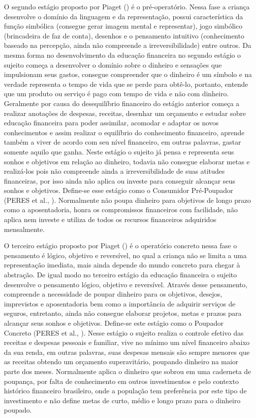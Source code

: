 O segundo estágio proposto por Piaget (\citeyear{piaget1971}) é o pré-operatório. Nessa fase a criança desenvolve o domínio da linguagem e da representação, possui característica da função simbólica (consegue gerar imagem mental e representar), jogo simbólico (brincadeira de faz de conta), desenhos e o pensamento intuitivo (conhecimento baseado na percepção, ainda não compreende a irreversibilidade) entre outros. Da mesma forma no desenvolvimento da educação financeira no segundo estágio o sujeito começa a desenvolver o domínio sobre o dinheiro e sensações que impulsionam seus gastos, consegue compreender que o dinheiro é um símbolo e na verdade representa o tempo de vida que se perde para obtê-lo, portanto, entende que um produto ou serviço é pago com tempo de vida e não com dinheiro. Geralmente por causa do desequilíbrio financeiro do estágio anterior começa a realizar anotações de despesas, receitas, desenhar um orçamento e estudar sobre educação financeira para poder assimilar, acomodar e adaptar os novos conhecimentos e assim realizar o equilíbrio do conhecimento financeiro, aprende também a viver de acordo com seu nível financeiro, em outras palavras, gastar somente aquilo que ganha. Neste estágio o sujeito já pensa e representa seus sonhos e objetivos em relação ao dinheiro, todavia não consegue elaborar metas e realizá-los pois não compreende ainda a irreversibilidade de suas atitudes financeiras, por isso ainda não aplica ou investe para conseguir alcançar seus sonhos e objetivos. Define-se esse estágio como o Consumidor Pré-Poupador (PERES et al., \citeyear{peres2019}). Normalmente não poupa dinheiro para objetivos de longo prazo como a aposentadoria, honra os compromissos financeiros com facilidade, não aplica nem investe e utiliza de todos os recursos financeiros adquiridos mensalmente.

O terceiro estágio proposto por Piaget (\citeyear{piaget1971}) é o operatório concreto nessa fase o pensamento é lógico, objetivo e reversível, no qual a criança não se limita a uma representação imediata, mais ainda depende do mundo concreto para chegar à abstração. De igual modo no terceiro estágio da educação financeira o sujeito desenvolve o pensamento lógico, objetivo e reversível. Através desse pensamento, compreende a necessidade de poupar dinheiro para os objetivos, desejos, imprevistos e aposentadoria bem como a importância de adquirir serviços de seguros, entretanto, ainda não consegue elaborar projetos, metas e prazos para alcançar seus sonhos e objetivos. Define-se este estágio como o Poupador Concreto (PERES et al., \citeyear{peres2019}). Nesse estágio o sujeito realiza o controle efetivo das receitas e despesas pessoais e familiar, vive no mínimo um nível financeiro abaixo da sua renda, em outras palavras, suas despesas mensais são sempre menores que as receitas obtendo um orçamento superavitário, poupando dinheiro na maior parte dos meses. Normalmente aplica o dinheiro que sobrou em uma caderneta de poupança, por falta de conhecimento em outros investimentos e pelo contexto histórico financeiro brasileiro, onde a população tem preferência por este tipo de investimento e não define metas de curto, médio e longo prazo para o dinheiro poupado.

